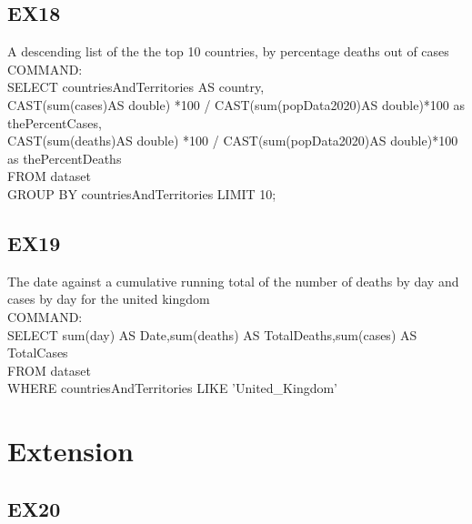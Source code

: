 \documentclass[]{article}
\begin{document}
\begin{titlepage}
		    \subsection{EX18}
		     A descending list of the the top 10 countries, by percentage deaths out of cases\\
		    COMMAND:\\
            SELECT countriesAndTerritories AS country,\\
            CAST(sum(cases)AS double) *100 / CAST(sum(popData2020)AS double)*100  as thePercentCases,\\
            CAST(sum(deaths)AS double) *100 / CAST(sum(popData2020)AS double)*100 as thePercentDeaths\\
            FROM dataset\\
            GROUP BY countriesAndTerritories LIMIT 10;\\
            
		    \subsection{EX19}
		    The date against a cumulative running total of the number of deaths by day and cases by day for the united kingdom\\
            COMMAND:\\
            SELECT sum(day) AS Date,sum(deaths) AS TotalDeaths,sum(cases) AS TotalCases\\
            FROM dataset\\
            WHERE countriesAndTerritories LIKE 'United_Kingdom'
		\section{Extension}
		    \subsection{EX20}
	\end{titlepage}
\end{document}
